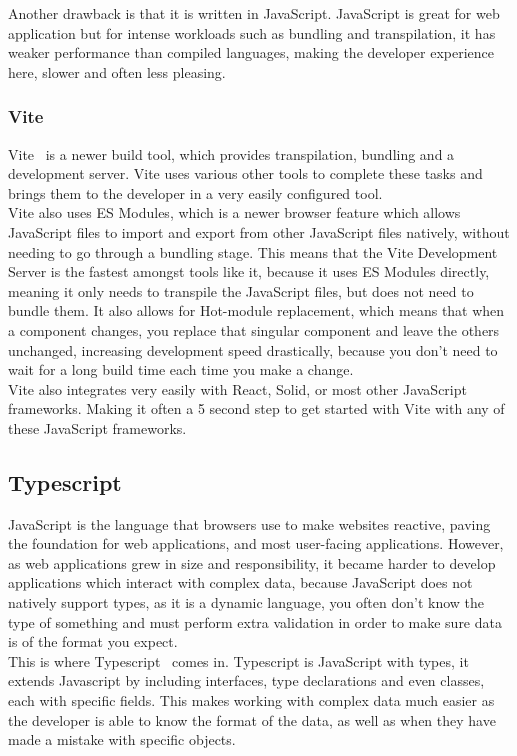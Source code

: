 \documentclass[titlepage]{article}
\begin{document}
Another drawback is that it is written in JavaScript. JavaScript is great for web application but for intense workloads such as bundling and transpilation, it has weaker performance than compiled languages, making the developer experience here, slower and often less pleasing.

\subsubsection{Vite}
Vite~\cite{vite} is a newer build tool, which provides transpilation, bundling and a development server. Vite uses various other tools to complete these tasks and brings them to the developer in a very easily configured tool. \\

Vite also uses ES Modules, which is a newer browser feature which allows JavaScript files to import and export from other JavaScript files natively, without needing to go through a bundling stage. This means that the Vite Development Server is the fastest amongst tools like it, because it uses ES Modules directly, meaning it only needs to transpile the JavaScript files, but does not need to bundle them. It also allows for Hot-module replacement, which means that when a component changes, you replace that singular component and leave the others unchanged, increasing development speed drastically, because you don't need to wait for a long build time each time you make a change. \\

Vite also integrates very easily with React, Solid, or most other JavaScript frameworks. Making it often a 5 second step to get started with Vite with any of these JavaScript frameworks.

\subsection{Typescript}
JavaScript is the language that browsers use to make websites reactive, paving the foundation for web applications, and most user-facing applications. However, as web applications grew in size and responsibility, it became harder to develop applications which interact with complex data, because JavaScript does not natively support types, as it is a dynamic language, you often don't know the type of something and must perform extra validation in order to make sure data is of the format you expect. \\

This is where Typescript~\cite{typescript} comes in. Typescript is JavaScript with types, it extends Javascript by including interfaces, type declarations and even classes, each with specific fields. This makes working with complex data much easier as the developer is able to know the format of the data, as well as when they have made a mistake with specific objects. \\
\end{document}
